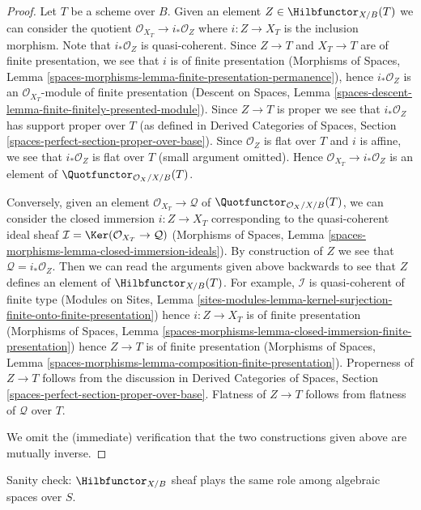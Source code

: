 \begin{proof}
Let $T$ be a scheme over $B$. Given an element
$Z \in \Hilbfunctor_{X/B}(T)$ we can consider the
quotient $\mathcal{O}_{X_T} \to i_*\mathcal{O}_Z$
where $i : Z \to X_T$ is the inclusion morphism.
Note that $i_*\mathcal{O}_Z$ is quasi-coherent.
Since $Z \to T$ and $X_T \to T$ are of finite presentation,
we see that $i$ is of finite presentation (Morphisms of Spaces, Lemma
\ref{spaces-morphisms-lemma-finite-presentation-permanence}), hence
$i_*\mathcal{O}_Z$ is an $\mathcal{O}_{X_T}$-module of
finite presentation (Descent on Spaces, Lemma
\ref{spaces-descent-lemma-finite-finitely-presented-module}).
Since $Z \to T$ is proper we see that $i_*\mathcal{O}_Z$
has support proper over $T$ (as defined in
Derived Categories of Spaces, Section
\ref{spaces-perfect-section-proper-over-base}).
Since $\mathcal{O}_Z$ is flat
over $T$ and $i$ is affine, we see that $i_*\mathcal{O}_Z$
is flat over $T$ (small argument omitted). Hence
$\mathcal{O}_{X_T} \to i_*\mathcal{O}_Z$
is an element of $\Quotfunctor_{\mathcal{O}_X/X/B}(T)$.

\medskip\noindent
Conversely, given an element $\mathcal{O}_{X_T} \to \mathcal{Q}$
of $\Quotfunctor_{\mathcal{O}_X/X/B}(T)$, we can consider
the closed immersion $i : Z \to X_T$ corresponding to
the quasi-coherent ideal sheaf
$\mathcal{I} = \Ker(\mathcal{O}_{X_T} \to \mathcal{Q})$
(Morphisms of Spaces, Lemma
\ref{spaces-morphisms-lemma-closed-immersion-ideals}).
By construction of $Z$ we see that $\mathcal{Q} = i_*\mathcal{O}_Z$.
Then we can read the arguments given above backwards to see
that $Z$ defines an element of $\Hilbfunctor_{X/B}(T)$.
For example, $\mathcal{I}$ is quasi-coherent of finite type
(Modules on Sites, Lemma
\ref{sites-modules-lemma-kernel-surjection-finite-onto-finite-presentation})
hence $i : Z \to X_T$ is of finite presentation
(Morphisms of Spaces, Lemma
\ref{spaces-morphisms-lemma-closed-immersion-finite-presentation})
hence $Z \to T$ is of finite presentation
(Morphisms of Spaces, Lemma
\ref{spaces-morphisms-lemma-composition-finite-presentation}).
Properness of $Z \to T$ follows from the discussion in
Derived Categories of Spaces, Section
\ref{spaces-perfect-section-proper-over-base}.
Flatness of $Z \to T$ follows from flatness of $\mathcal{Q}$ over $T$.

\medskip\noindent
We omit the (immediate) verification that the two constructions given
above are mutually inverse.
\end{proof}

Sanity check: $\Hilbfunctor_{X/B}$
sheaf plays the same role among algebraic spaces over $S$.

